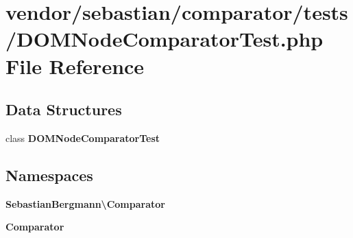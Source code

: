 \section{vendor/sebastian/comparator/tests/\+D\+O\+M\+Node\+Comparator\+Test.php File Reference}
\label{_d_o_m_node_comparator_test_8php}
\subsection*{Data Structures}
\begin{DoxyCompactItemize}
\item 
class {\bf D\+O\+M\+Node\+Comparator\+Test}
\end{DoxyCompactItemize}
\subsection*{Namespaces}
\begin{DoxyCompactItemize}
\item 
 {\bf Sebastian\+Bergmann\textbackslash{}\+Comparator}
\item 
 {\bf Comparator}
\end{DoxyCompactItemize}
